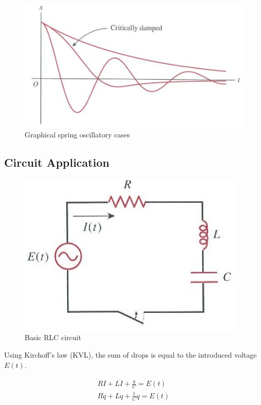 \begin{figure}[H]
    \centering
    \includegraphics[scale=0.6]{figures/Screen Shot 2021-12-12 at 6.18.51 PM.png}
    \caption{Graphical spring oscillatory cases}
\end{figure}

\subsection{Circuit Application}

\begin{figure}[H]
    \centering
    \includegraphics[]{figures/RLC.png}
    \caption{Basic RLC circuit}
\end{figure}

Using Kirchoff's law (KVL), the sum of drops is equal to the introduced voltage $E(t)$.

\begin{align}
    RI+L\dot I+\frac{q}{C}=E(t)\\
    R\dot q+L\ddot q+\frac{1}{C}q=E(t)
\end{align}

